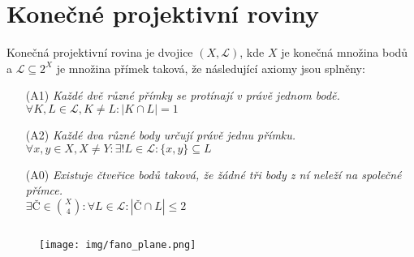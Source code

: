 \section{Konečné projektivní roviny}
\begin{t_definition}
  Konečná projektivní rovina je dvojice $(X, \mathcal{L})$, kde $X$ je konečná množina bodů a $\mathcal{L}\subseteq 2^X$ je množina přímek taková, že následující axiomy jsou splněny:
  \begin{enumerate}
    \item[(A1)]
    \textit{Každé dvě různé přímky se protínají v právě jednom bodě.}
    \\$\forall K,L\in\mathcal{L},K\neq L : |K\cap L|=1$
    \item[(A2)]
    \textit{Každé dva různé body určují právě jednu přímku.}
    \\$\forall x,y\in X,X\neq Y : \exists! L\in\mathcal{L} : \{x, y\}\subseteq L$
    \item[(A0)]
    \textit{Existuje čtveřice bodů taková, že žádné tři body z ní neleží na společné přímce.}
    \\$\exists Č\in\binom{X}{4}:\forall L\in\mathcal{L}:|Č\cap L|\leq 2$
  \end{enumerate}
\end{t_definition}

\begin{t_example}$ $
  \begin{figure}[!htbp]
    \centering
    \texttt{[image: img/fano\_plane.png]}
  \end{figure}
\end{t_example}

